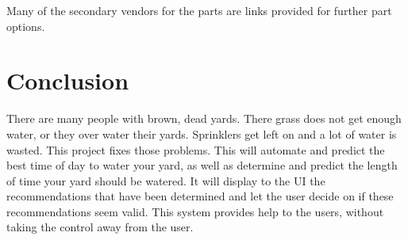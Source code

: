 \documentclass[letterpaper, 10 pt, conference]{ieeeconf}  %
\begin{document}
Many of the secondary vendors for the parts are links provided for further part options.
\section{Conclusion}


There are many people with brown, dead yards. There grass does not get enough water, or they over water their yards. Sprinklers get left on and a lot of water is wasted. This project fixes those problems. This will automate and predict the best time of day to water your yard, as well as determine and predict the length of time your yard should be watered. It will display to the UI the recommendations that have been determined and let the user decide on if these recommendations seem valid. This system provides help to the users, without taking the control away from the user. 
\end{document}
